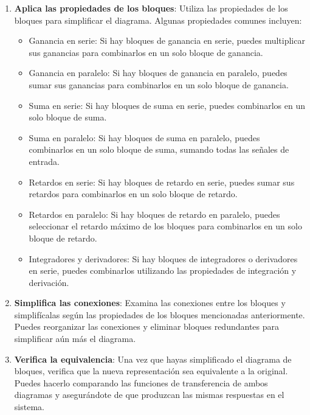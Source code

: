 \documentclass[
	12pt, %
	fleqn, %
	a4paper, %
	oneside, %
]{LegrandOrangeBook}
\begin{document}
\begin{enumerate}
\item \textbf{Aplica las propiedades de los bloques}: Utiliza las propiedades de los bloques para simplificar el diagrama. Algunas propiedades comunes incluyen:
\begin{itemize}
\item Ganancia en serie: Si hay bloques de ganancia en serie, puedes multiplicar sus ganancias para combinarlos en un solo bloque de ganancia.
\item Ganancia en paralelo: Si hay bloques de ganancia en paralelo, puedes sumar sus ganancias para combinarlos en un solo bloque de ganancia.
\item Suma en serie: Si hay bloques de suma en serie, puedes combinarlos en un solo bloque de suma.
\item Suma en paralelo: Si hay bloques de suma en paralelo, puedes combinarlos en un solo bloque de suma, sumando todas las señales de entrada.
\item Retardos en serie: Si hay bloques de retardo en serie, puedes sumar sus retardos para combinarlos en un solo bloque de retardo.
\item Retardos en paralelo: Si hay bloques de retardo en paralelo, puedes seleccionar el retardo máximo de los bloques para combinarlos en un solo bloque de retardo.
\item Integradores y derivadores: Si hay bloques de integradores o derivadores en serie, puedes combinarlos utilizando las propiedades de integración y derivación.	
\end{itemize}
\item \textbf{Simplifica las conexiones}: Examina las conexiones entre los bloques y simplifícalas según las propiedades de los bloques mencionadas anteriormente. Puedes reorganizar las conexiones y eliminar bloques redundantes para simplificar aún más el diagrama.
\item \textbf{Verifica la equivalencia}: Una vez que hayas simplificado el diagrama de bloques, verifica que la nueva representación sea equivalente a la original. Puedes hacerlo comparando las funciones de transferencia de ambos diagramas y asegurándote de que produzcan las mismas respuestas en el sistema.
\end{enumerate}
\end{document}
